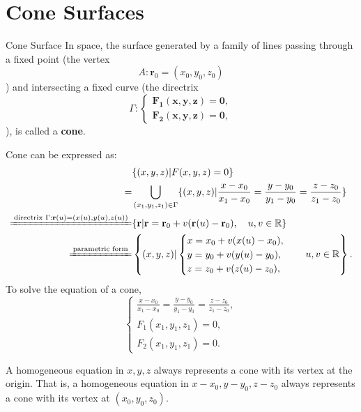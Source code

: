 \documentclass[11pt]{../../TexTemplate/elegantbook} %
\begin{document}
\section{Cone Surfaces} %
\begin{definition}{Cone Surface}
    In space, the surface generated by a family of lines passing through a fixed point 
    (the vertex \[A:\mathbf{r}_{0}=(x_{0},y_{0},z_{0})\]) 
    and intersecting a fixed curve 
    (the directrix \[\Gamma : \mathbf{\begin{cases} F_{1}(x,y,z) = 0,\\ F_{2}(x,y,z) = 0,\end{cases}}\]), 
    is called a \textbf{cone}.
\end{definition}
Cone can be expressed as:
\begin{align*}
    &\{ (x,y,z) | F(x,y,z) = 0 \} \\
    =&\bigcup_{(x_{1},y_{1},z_{1}) \in \Gamma} \{ (x,y,z) | \frac{x - x_{0}}{x_{1} - x_{0}} = \frac{y - y_{0}}{y_{1} - y_{0}} = \frac{z - z_{0}}{z_{1} - z_{0}} \}\\
    \xlongequal{\text{directrix } \Gamma:\mathbf{r}(u)=(x(u),y(u),z(u))}
    &\{ \mathbf{r} | \mathbf{r} = \mathbf{r}_{0}+v (\mathbf{r}(u)-\mathbf{r}_{0}),\quad u,v \in \mathbb{R} \} \\
    \xlongequal{\text{parametric form}}
    &  \left\{ (x,y,z) | \begin{cases} x = x_{0} + v(x(u) - x_{0}), \\ y = y_{0} + v(y(u) - y_{0}), \\ z = z_{0} + v(z(u) - z_{0}), \end{cases}\quad u,v \in \mathbb{R} \right\}.
\end{align*}
To solve the equation of a cone,
\[
\begin{cases}
    \frac{x - x_{0}}{x_{1} - x_{0}} = \frac{y - y_{0}}{y_{1} - y_{0}} = \frac{z - z_{0}}{z_{1} - z_{0}}, \\
    F_{1}(x_{1},y_{1},z_{1}) = 0, \\
    F_{2}(x_{1},y_{1},z_{1}) = 0.
\end{cases}
\]

\vspace{0.7cm}
\begin{theorem}
    A homogeneous equation in \(x, y, z\) always represents a cone with its vertex at the origin.
    That is, a homogeneous equation in \(x-x_{0}, y-y_{0}, z-z_{0}\) always represents a cone 
    with its vertex at \((x_{0}, y_{0}, z_{0})\).
\end{theorem}
\end{document}

